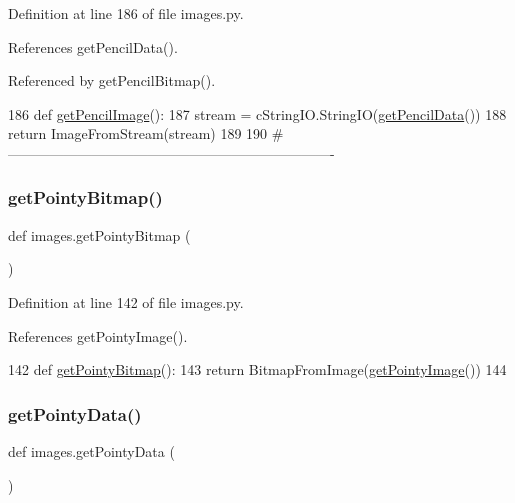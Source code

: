Definition at line 186 of file images.\+py.



References get\+Pencil\+Data().



Referenced by get\+Pencil\+Bitmap().


\begin{DoxyCode}
186 \textcolor{keyword}{def }\hyperlink{namespaceimages_a695877c0a720a45d82a271c8fdeb1887}{getPencilImage}():
187     stream = cStringIO.StringIO(\hyperlink{namespaceimages_a5d8df1140a3cfdc7bd201547c9bba93d}{getPencilData}())
188     \textcolor{keywordflow}{return} ImageFromStream(stream)
189 
190 \textcolor{comment}{#----------------------------------------------------------------------}
\end{DoxyCode}
\mbox{\label{namespaceimages_a827147fb0444cc320cf9ad0b7ea76d68}} 
\subsubsection{\texorpdfstring{get\+Pointy\+Bitmap()}{getPointyBitmap()}}
{\footnotesize\ttfamily def images.\+get\+Pointy\+Bitmap (\begin{DoxyParamCaption}{ }\end{DoxyParamCaption})}



Definition at line 142 of file images.\+py.



References get\+Pointy\+Image().


\begin{DoxyCode}
142 \textcolor{keyword}{def }\hyperlink{namespaceimages_a827147fb0444cc320cf9ad0b7ea76d68}{getPointyBitmap}():
143     \textcolor{keywordflow}{return} BitmapFromImage(\hyperlink{namespaceimages_a38998e5e6aca706b4ea435db9d73ebcf}{getPointyImage}())
144 
\end{DoxyCode}
\mbox{\label{namespaceimages_a79b62e36e634b9e6d8a72ea625ebc585}} 
\subsubsection{\texorpdfstring{get\+Pointy\+Data()}{getPointyData()}}
{\footnotesize\ttfamily def images.\+get\+Pointy\+Data (\begin{DoxyParamCaption}{ }\end{DoxyParamCaption})}



